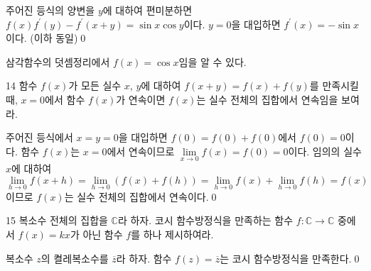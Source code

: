 \documentclass{article}
\begin{document}
\begin{sol}[편미분 풀이]
	주어진 등식의 양변을 $y$에 대하여 편미분하면 $f(x)f^\prime(y)-f^\prime(x+y)=\sin x\cos y$이다. $y=0$을 대입하면 $f^\prime(x)=-\sin x$이다. (이하 동일)\qed
\end{sol}

\begin{remark}
	삼각함수의 덧셈정리에서 $f(x)=\cos x$임을 알 수 있다.
\end{remark}

\newpage
\begin{prob}{}{14}
	함수 $f(x)$가 모든 실수 $x$, $y$에 대하여 $f(x+y)=f(x)+f(y)$를 만족시킬 때, $x=0$에서 함수 $f(x)$가 연속이면 $f(x)$는 실수 전체의 집합에서 연속임을 보여라.
\end{prob}

\begin{sol}
	주어진 등식에서 $x=y=0$을 대입하면 $f(0)=f(0)+f(0)$에서 $f(0)=0$이다. 함수 $f(x)$는 $x=0$에서 연속이므로 $\lim\limits_{x\to0}f(x)=f(0)=0$이다. 임의의 실수 $x$에 대하여
	\[
		\lim\limits_{h\to0}f(x+h)=\lim\limits_{h\to0}(f(x)+f(h))=\lim\limits_{h\to0}f(x)+\lim\limits_{h\to0}f(h)=f(x)
	\]
	이므로 $f(x)$는 실수 전체의 집합에서 연속이다.\qed
\end{sol}

\newpage
\begin{prob}{}{15}
	복소수 전체의 집합을 $\mathbb C$라 하자. 코시 함수방정식을 만족하는 함수 $f:\mathbb C\to\mathbb C$ 중에서 $f(x)=kx$가 아닌 함수 $f$를 하나 제시하여라.
\end{prob}

\begin{sol}
	복소수 $z$의 켤레복소수를 $\overline{z}$라 하자. 함수 $f(z)=\overline{z}$는 코시 함수방정식을 만족한다.\qed
\end{sol}
\end{document}
